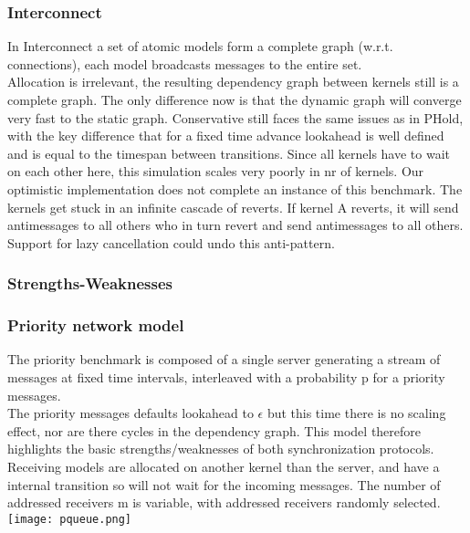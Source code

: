 \subsubsection{Interconnect}
In Interconnect %
a set of atomic models form a complete graph (w.r.t. connections), each model broadcasts messages to the entire set. \\
Allocation is irrelevant, the resulting dependency graph between kernels still is a complete graph. The only difference now is that the dynamic graph will converge very fast to the static graph. %
Conservative still faces the same issues as in PHold, with the key difference that for a fixed time advance lookahead is well defined and is equal to the timespan between transitions. Since all kernels have to wait on each other here, this simulation scales very poorly in nr of kernels.
Our optimistic implementation does not complete an instance of this benchmark. The kernels get stuck in an infinite cascade of reverts. If kernel A reverts, it will send antimessages to all others who in turn revert and send antimessages to all others. Support for lazy cancellation could undo this anti-pattern.
\subsubsection{Strengths-Weaknesses} %
\subsubsection{Priority network model}
The priority benchmark is composed of a single server generating a stream of messages at fixed time intervals, interleaved with a probability p for a priority messages. \\ The priority messages defaults lookahead to $\epsilon$ but this time there is no scaling effect, nor are there cycles in the dependency graph. This model therefore highlights the basic strengths/weaknesses of both synchronization protocols. Receiving models are allocated on another kernel than the server, and have a internal transition so will not wait for the incoming messages. The number of addressed receivers m is variable, with addressed receivers randomly selected.
\texttt{[image: pqueue.png]}
% 


